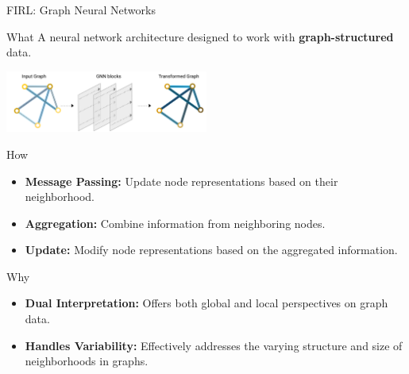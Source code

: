 \documentclass[presentation, 8pt,169]{beamer}\mode<presentation>{\usetheme{AMSBolognaFC}}
\begin{document}
\begin{frame}{FIRL: Graph Neural Networks}
  \begin{exampleblock}{What}
    A neural network architecture designed to work with \textbf{graph-structured} data.
  \end{exampleblock}

  \begin{center}
    \includegraphics[width=0.5\textwidth]{img/gnn.png}
  \end{center}

  \begin{block}{How}
    \begin{itemize}
      \item \textbf{Message Passing:} Update node representations based on their neighborhood.
      \item \textbf{Aggregation:} Combine information from neighboring nodes.
      \item \textbf{Update:} Modify node representations based on the aggregated information.
    \end{itemize}
  \end{block}

  \begin{alertblock}{Why}
    \begin{itemize}
      \item \textbf{Dual Interpretation:} Offers both global and local perspectives on graph data.
      \item \textbf{Handles Variability:} Effectively addresses the varying structure and size of neighborhoods in graphs.
    \end{itemize}
  \end{alertblock}
\end{frame}
\end{document}
